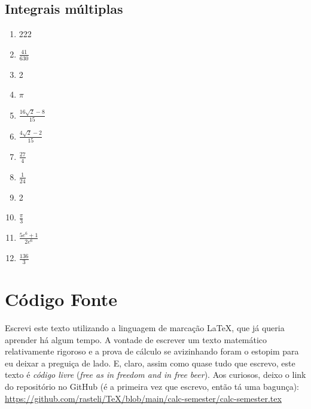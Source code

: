 \documentclass[a4paper, 12pt]{extreport}
\newcommand{\latex}{\LaTeX{}}
\begin{document}
    \section*{Integrais múltiplas}
      \begin{multicols}{4}
        \begin{enumerate}
          \item 222
          \item $\frac{41}{630}$
          \item 2
          \item $\pi$
          \item $\frac{16\sqrt{2}-8}{15}$
          \item $\frac{4\sqrt{2}-2}{15}$
          \item $\frac{27}{4}$
          \item $\frac{1}{24}$
          \item 2
          \item $\frac{\pi}{3}$
          \item $\frac{5e^6+1}{2e^6}$
          \item $\frac{136}{3}$
        \end{enumerate}
      \end{multicols}

  \chapter{Código Fonte}
    Escrevi este texto utilizando a linguagem de marcação \latex, que já queria aprender há algum tempo. A vontade de escrever
    um texto matemático relativamente rigoroso e a prova de cálculo se avizinhando foram o estopim para eu deixar a preguiça de lado.
    E, claro, assim como quase tudo que escrevo, este texto é \textsl{código livre} (\textsl{free as in freedom and in free beer}).
    Aos curiosos, deixo o link do repositório no GitHub (é a primeira vez que escrevo, então tá uma bagunça): \url{https://github.com/rasteli/TeX/blob/main/calc-semester/calc-semester.tex}
\end{document}
